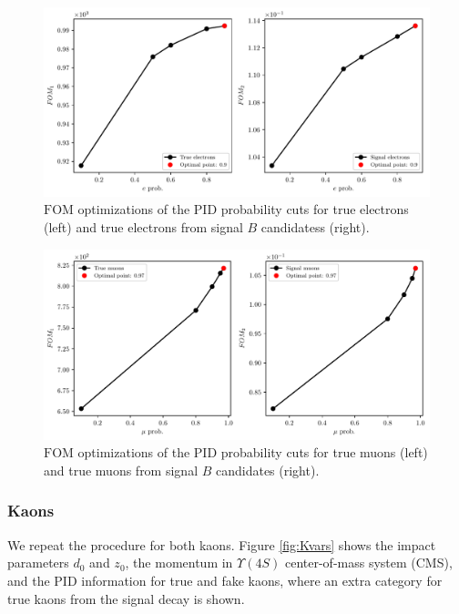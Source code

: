 \begin{figure}[H]
\centering
\captionsetup{width=.8\linewidth}
\includegraphics[width=\linewidth]{fig/FSP_e_fom}
\caption{$\mathrm{FOM}$ optimizations of the PID probability cuts for true electrons (left) and true electrons from signal $B$ candidatess (right).}
\label{fig:efom}
\end{figure}

\begin{figure}[H]
\centering
\captionsetup{width=.8\linewidth}
\includegraphics[width=\linewidth]{fig/FSP_mu_fom}
\caption{$\mathrm{FOM}$ optimizations of the PID probability cuts for true muons (left) and true muons from signal $B$ candidates (right).}
\label{fig:mufom}
\end{figure}


\subsubsection{Kaons}

We repeat the procedure for both kaons. Figure \ref{fig:Kvars} shows the impact parameters $d_0$ and $z_0$, the momentum in  $\Upsilon(4S)$ center-of-mass system (CMS), and the PID information for true and fake kaons, where an extra category for true kaons from the signal decay is shown.

